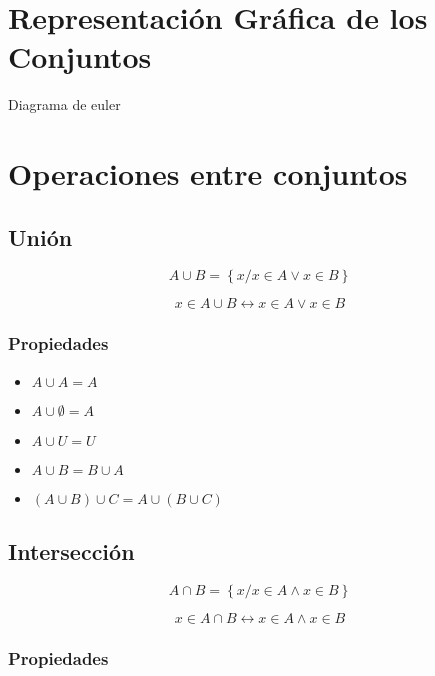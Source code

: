 \documentclass[
  16pt,
]{krantz}
\providecommand{\tightlist}{%
  \setlength{\itemsep}{0pt}\setlength{\parskip}{0pt}}
\theoremstyle{definition}
\theoremstyle{definition}
\theoremstyle{definition}
\theoremstyle{definition}
\theoremstyle{remark}
\begin{document}
\hypertarget{representaciuxf3n-gruxe1fica-de-los-conjuntos}{%
\section{Representación Gráfica de los Conjuntos}\label{representaciuxf3n-gruxe1fica-de-los-conjuntos}}

Diagrama de euler

\hypertarget{operaciones-entre-conjuntos}{%
\section{Operaciones entre conjuntos}\label{operaciones-entre-conjuntos}}

\hypertarget{uniuxf3n}{%
\subsection{Unión}\label{uniuxf3n}}

\[
A\cup B=\left\{x/x\in A\vee x\in B\right\}
\]

\[
x\in A\cup B\leftrightarrow x\in A\vee x\in B
\]

\hypertarget{propiedades-3}{%
\subsubsection{Propiedades}\label{propiedades-3}}

\begin{itemize}
\tightlist
\item
  \(A\cup A=A\)
\item
  \(A\cup \emptyset=A\)
\item
  \(A\cup U=U\)
\item
  \(A\cup B=B\cup A\)
\item
  \((A\cup B)\cup C=A\cup(B\cup C)\)
\end{itemize}

\hypertarget{intersecciuxf3n}{%
\subsection{Intersección}\label{intersecciuxf3n}}

\[
A\cap B=\left\{x/x\in A\wedge x\in B\right\}
\]

\[
x\in A\cap B\leftrightarrow x\in A\wedge x\in B
\]

\hypertarget{propiedades-4}{%
\subsubsection{Propiedades}\label{propiedades-4}}
\end{document}
